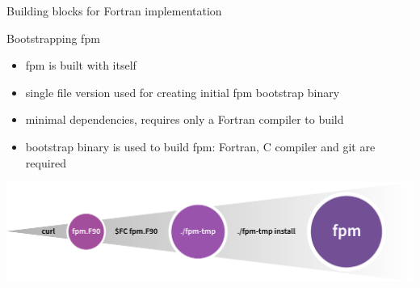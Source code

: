 \documentclass[lualatex,10pt,aspectratio=169]{beamer}
\begin{document}
\begin{frame}{Building blocks for Fortran implementation}
\end{frame}

\begin{frame}{Bootstrapping fpm}
   \begin{itemize}
      \item fpm is built with itself
      \item single file version used for creating initial fpm bootstrap binary
      \item minimal dependencies, requires only a Fortran compiler to build
      \item bootstrap binary is used to build fpm: Fortran, C compiler and git are required
   \end{itemize}
   \vfill

   \centering
   \includegraphics[width=.9\textwidth]{Figures/bootstrapping.pdf}
\end{frame}
\end{document}
